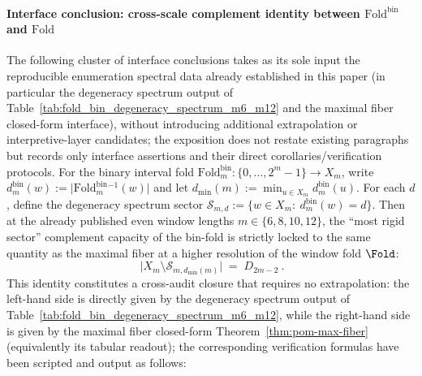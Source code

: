 \paragraph{Interface conclusion: cross-scale complement identity between \texorpdfstring{$\mathrm{Fold}^{\mathrm{bin}}$}{Foldbin} and \texorpdfstring{$\mathrm{Fold}$}{Fold}}\label{par:gut-foldbin-fold-complement-identity}
The following cluster of interface conclusions takes as its sole input the reproducible enumeration spectral data already established in this paper (in particular the degeneracy spectrum output of Table~\ref{tab:fold_bin_degeneracy_spectrum_m6_m12} and the maximal fiber closed-form interface),
without introducing additional extrapolation or interpretive-layer candidates; the exposition does not restate existing paragraphs but records only interface assertions and their direct corollaries/verification protocols.
For the binary interval fold \(\mathrm{Fold}^{\mathrm{bin}}_m:\{0,\dots,2^m-1\}\to X_m\), write
\(
d^{\mathrm{bin}}_m(w):=\bigl|\mathrm{Fold}^{\mathrm{bin}}_m{}^{-1}(w)\bigr|
\)
and let \(d_{\min}(m):=\min_{u\in X_m}d^{\mathrm{bin}}_m(u)\).
For each \(d\), define the degeneracy spectrum sector
\(
\mathcal{S}_{m,d}:=\{w\in X_m:\ d^{\mathrm{bin}}_m(w)=d\}
\).
Then at the already published even window lengths \(m\in\{6,8,10,12\}\), the ``most rigid sector'' complement capacity of the bin-fold is strictly locked to the same quantity as the maximal fiber at a higher resolution of the window fold \(\Fold\):
\[
\boxed{\ \bigl|X_m\setminus \mathcal{S}_{m,d_{\min}(m)}\bigr|\;=\;D_{2m-2}\ }.
\]
This identity constitutes a cross-audit closure that requires no extrapolation: the left-hand side is directly given by the degeneracy spectrum output of Table~\ref{tab:fold_bin_degeneracy_spectrum_m6_m12}, while the right-hand side is given by the maximal fiber closed-form Theorem~\ref{thm:pom-max-fiber} (equivalently its tabular readout); the corresponding verification formulas have been scripted and output as follows:


